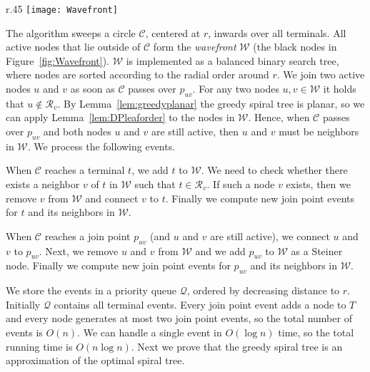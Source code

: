 \documentclass{journalA4}
\begin{document}
\begin{wrapfigure}[9]{r}{.45\textwidth}
  \centering
  \texttt{[image: Wavefront]}
  \small{\caption{The wavefront $\mathcal{W}$.\label{fig:Wavefront}}}
\end{wrapfigure}
The algorithm sweeps a circle $\mathcal{C}$, centered at $r$, inwards over all terminals. All active nodes that lie outside of $\mathcal{C}$ form the \emph{wavefront}
$\mathcal{W}$ (the black nodes in Figure~\ref{fig:Wavefront}). $\mathcal{W}$ is implemented as a balanced binary search tree, where nodes are sorted according to the radial order
around $r$. We join two active nodes $u$ and $v$ as soon as $\mathcal{C}$ passes over $p_{uv}$. For any two nodes $u, v \in \mathcal{W}$ it holds that $u \notin \mathcal{R}_v$.
By Lemma~\ref{lem:greedyplanar} the greedy spiral tree is planar, so we can apply Lemma~\ref{lem:DPleaforder} to the nodes in $\mathcal{W}$. Hence, when $\mathcal{C}$ passes over $p_{uv}$ and both nodes $u$
and $v$ are still active, then $u$ and $v$ must be neighbors in $\mathcal{W}$. We process the following events.
\begin{description}\itemsep0pt
  \item[Terminal.] When $\mathcal{C}$ reaches a terminal $t$, we add $t$ to $\mathcal{W}$. We need to check whether there exists a neighbor $v$ of $t$ in $\mathcal{W}$ such that $t \in \mathcal{R}_v$. If such a node $v$ exists, then we remove $v$ from $\mathcal{W}$ and connect $v$ to $t$. Finally we compute new join point events for $t$ and its neighbors in $\mathcal{W}$.
  \item[Join point.] When $\mathcal{C}$ reaches a join point $p_{uv}$ (and $u$ and $v$ are still active), we connect $u$ and $v$ to $p_{uv}$. Next, we remove $u$ and $v$ from $\mathcal{W}$ and we add $p_{uv}$ to $\mathcal{W}$ as a Steiner node. Finally we compute new join point events for $p_{uv}$ and its neighbors in $\mathcal{W}$.
\end{description}
We store the events in a priority queue $\mathcal{Q}$, ordered by decreasing distance to $r$. Initially $\mathcal{Q}$ contains all terminal events. Every join point event adds a
node to $T$ and every node generates at most two join point events, so the total number of events is $O(n)$. We can handle a single event in $O(\log n)$ time, so the total running
time is $O(n \log n)$.
Next we prove that the greedy spiral tree is an approximation of the optimal spiral tree.
\end{document}
